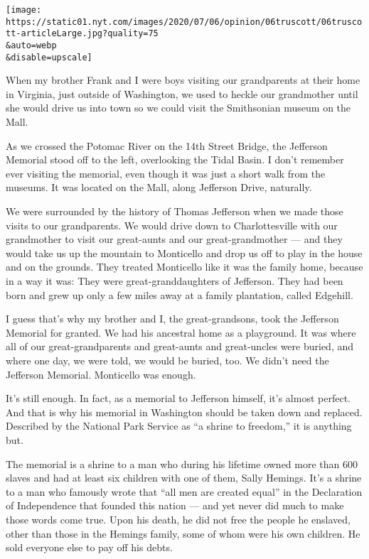 \texttt{[image: https://static01.nyt.com/images/2020/07/06/opinion/06truscott/06truscott-articleLarge.jpg?quality=75\\\&auto=webp\\\&disable=upscale]}

When my brother Frank and I were boys visiting our grandparents at their
home in Virginia, just outside of Washington, we used to heckle our
grandmother until she would drive us into town so we could visit the
Smithsonian museum on the Mall.

As we crossed the Potomac River on the 14th Street Bridge, the Jefferson
Memorial stood off to the left, overlooking the Tidal Basin. I don't
remember ever visiting the memorial, even though it was just a short
walk from the museums. It was located on the Mall, along Jefferson
Drive, naturally.

We were surrounded by the history of Thomas Jefferson when we made those
visits to our grandparents. We would drive down to Charlottesville with
our grandmother to visit our great-aunts and our great-grandmother ---
and they would take us up the mountain to Monticello and drop us off to
play in the house and on the grounds. They treated Monticello like it
was the family home, because in a way it was: They were
great-granddaughters of Jefferson. They had been born and grew up only a
few miles away at a family plantation, called Edgehill.

I guess that's why my brother and I, the great-grandsons, took the
Jefferson Memorial for granted. We had his ancestral home as a
playground. It was where all of our great-grandparents and great-aunts
and great-uncles were buried, and where one day, we were told, we would
be buried, too. We didn't need the Jefferson Memorial. Monticello was
enough.

It's still enough. In fact, as a memorial to Jefferson himself, it's
almost perfect. And that is why his memorial in Washington should be
taken down and replaced. Described by the National Park Service as ``a
shrine to freedom,'' it is anything but.

The memorial is a shrine to a man who during his lifetime owned more
than 600 slaves and had at least six children with one of them, Sally
Hemings. It's a shrine to a man who famously wrote that ``all men are
created equal'' in the Declaration of Independence that founded this
nation --- and yet never did much to make those words come true. Upon
his death, he did not free the people he enslaved, other than those in
the Hemings family, some of whom were his own children. He sold everyone
else to pay off his debts.

